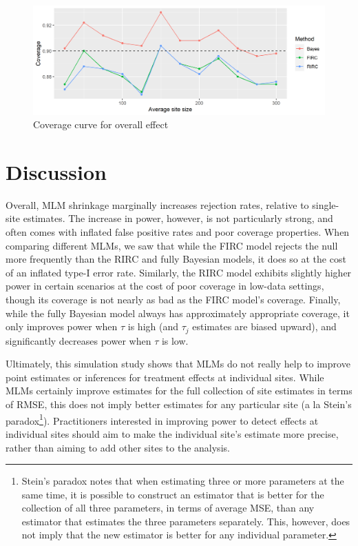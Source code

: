 \documentclass[]{article}
\begin{document}
\begin{figure}[ht]
	\centering
	\includegraphics[width=\textwidth]{coverage_plot_overall_tau02}
	\caption{Coverage curve for overall effect}
	\label{fig:coverage_plot_overall}
\end{figure}


\section{Discussion}

Overall, MLM shrinkage marginally increases rejection rates, relative to single-site estimates.
The increase in power, however, is not particularly strong, and often comes with inflated false positive rates and poor coverage properties.
When comparing different MLMs, we saw that while the FIRC model rejects the null more frequently than the RIRC and fully Bayesian models, it does so at the cost of an inflated type-I error rate.
Similarly, the RIRC model exhibits slightly higher power in certain scenarios at the cost of poor coverage in low-data settings, though its coverage is not nearly as bad as the FIRC model's coverage.
Finally, while the fully Bayesian model always has approximately appropriate coverage, it only improves power when $\tau$ is high (and $\tau_j$ estimates are biased upward), and significantly decreases power when $\tau$ is low.

Ultimately, this simulation study shows that MLMs do not really help to improve point estimates or inferences for treatment effects at individual sites.
While MLMs certainly improve estimates for the full collection of site estimates in terms of RMSE, this does not imply better estimates for any particular site (a la Stein's paradox\footnote{Stein's paradox notes that when estimating three or more parameters at the same time, it is possible to construct an estimator that is better for the collection of all three parameters, in terms of average MSE, than any estimator that estimates the three parameters separately.
This, however, does not imply that the new estimator is better for any individual parameter.}).
Practitioners interested in improving power to detect effects at individual sites should aim to make the individual site's estimate more precise, rather than aiming to add other sites to the analysis.
\end{document}

